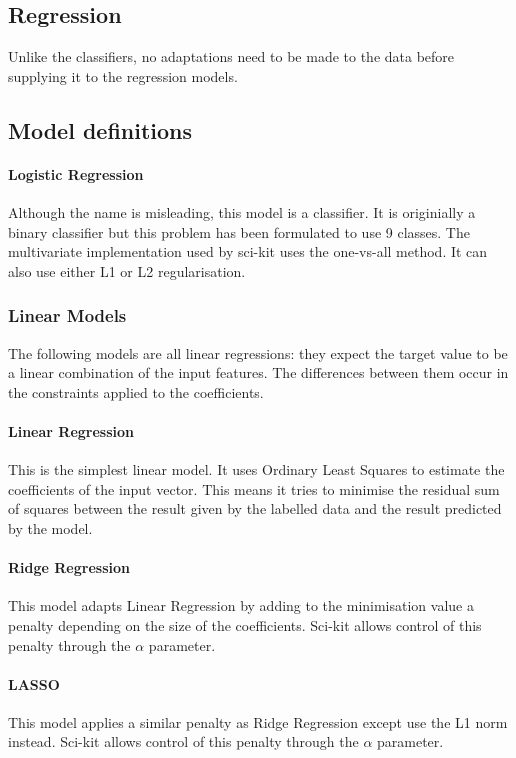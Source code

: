 \subsection{Regression}
Unlike the classifiers, no adaptations need to be made to the data before supplying it to the regression models.

\subsection{Model definitions}

\paragraph{Logistic Regression}
Although the name is misleading, this model is a classifier. It is originially a binary classifier but this problem has been formulated to use 9 classes. The multivariate implementation used by sci-kit uses the one-vs-all method. It can also use either L1 or L2 regularisation.

\subsubsection{Linear Models}
The following models are all linear regressions: they expect the target value to be a linear combination of the input features. The differences between them occur in the constraints applied to the coefficients.

\paragraph{Linear Regression}
This is the simplest linear model. It uses Ordinary Least Squares to estimate the coefficients of the input vector. This means it tries to minimise the residual sum of squares between the result given by the labelled data and the result predicted by the model.

\paragraph{Ridge Regression}
This model adapts Linear Regression by adding to the minimisation value a penalty depending on the size of the coefficients. Sci-kit allows control of this penalty through the $\alpha$ parameter.

\paragraph{LASSO}
This model applies a similar penalty as Ridge Regression except use the L1 norm instead. Sci-kit allows control of this penalty through the $\alpha$ parameter.

